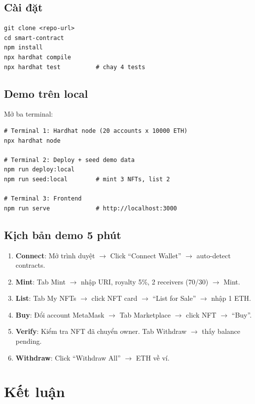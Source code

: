 \documentclass[12pt,a4paper,oneside]{report}
\theoremstyle{plain}
\theoremstyle{definition}
\theoremstyle{remark}
\begin{document}
\section{Cài đặt}
\begin{lstlisting}[numbers=none]
git clone <repo-url>
cd smart-contract
npm install
npx hardhat compile
npx hardhat test          # chay 4 tests
\end{lstlisting}

\section{Demo trên local}
Mở ba terminal:
\begin{lstlisting}[numbers=none]
# Terminal 1: Hardhat node (20 accounts x 10000 ETH)
npx hardhat node

# Terminal 2: Deploy + seed demo data
npm run deploy:local
npm run seed:local        # mint 3 NFTs, list 2

# Terminal 3: Frontend
npm run serve             # http://localhost:3000
\end{lstlisting}

\section{Kịch bản demo 5 phút}
\begin{enumerate}
  \item \textbf{Connect}: Mở trình duyệt $\to$ Click ``Connect Wallet'' $\to$ auto-detect contracts.
  \item \textbf{Mint}: Tab Mint $\to$ nhập URI, royalty 5\%, 2 receivers (70/30) $\to$ Mint.
  \item \textbf{List}: Tab My NFTs $\to$ click NFT card $\to$ ``List for Sale'' $\to$ nhập 1 ETH.
  \item \textbf{Buy}: Đổi account MetaMask $\to$ Tab Marketplace $\to$ click NFT $\to$ ``Buy''.
  \item \textbf{Verify}: Kiểm tra NFT đã chuyển owner. Tab Withdraw $\to$ thấy balance pending.
  \item \textbf{Withdraw}: Click ``Withdraw All'' $\to$ ETH về ví.
\end{enumerate}

\chapter{Kết luận}
\label{chap:conclusion}
\end{document}

